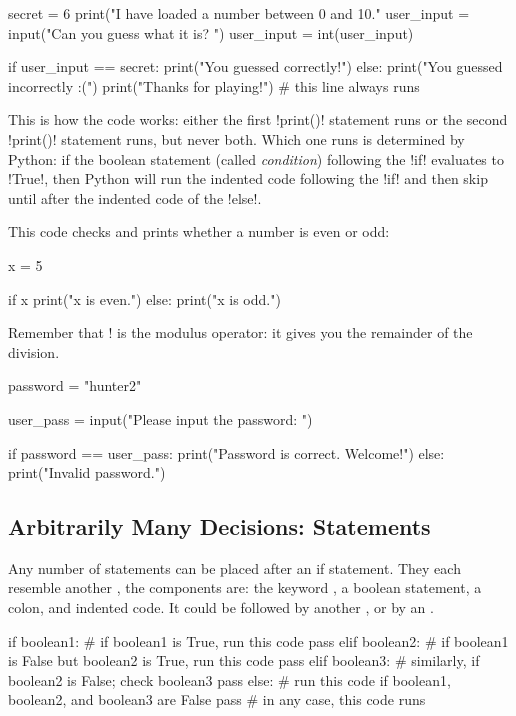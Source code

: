 \documentclass[11pt]{cselabheader}
\begin{document}
\begin{python3code}
secret = 6
print("I have loaded a number between 0 and 10."
user_input = input("Can you guess what it is? ")
user_input = int(user_input)

if user_input == secret:
    print("You guessed correctly!")
else:
    print("You guessed incorrectly :(")
print("Thanks for playing!")  # this line always runs
\end{python3code}

This is how the code works: either the first
\pythoninline!print()!
statement runs or the second \pythoninline!print()! statement runs, but never
both. Which one runs is determined by Python: if the boolean statement (called
\emph{condition}) following the \pythoninline!if! evaluates to
\pythoninline!True!, then Python will run the indented code following the
\pythoninline!if! and then skip until after the indented code of the
\pythoninline!else!.

This code checks and prints whether a number is even or odd:

\begin{python3code}
x = 5

if x %
    print("x is even.")
else:
    print("x is odd.")
\end{python3code}

Remember that \pythoninline!%
is the modulus operator: it gives you the remainder of the division.

\begin{python3code}
password = "hunter2"

user_pass = input("Please input the password: ")

if password == user_pass:
    print("Password is correct. Welcome!")
else:
    print("Invalid password.")
\end{python3code}

\subsection{Arbitrarily Many Decisions:  Statements}

Any number of  statements can be placed after an if
statement.  They each resemble another , the
components are: the keyword , a boolean statement,
a colon, and indented code.  It could be followed by another
, or by an .

\begin{python3code}
if boolean1:
    # if boolean1 is True, run this code
    pass
elif boolean2:
    # if boolean1 is False but boolean2 is True, run this code
    pass
elif boolean3:
    # similarly, if boolean2 is False; check boolean3
    pass
else:
    # run this code if boolean1, boolean2, and boolean3 are False
    pass
# in any case, this code runs
\end{python3code}
\end{document}
